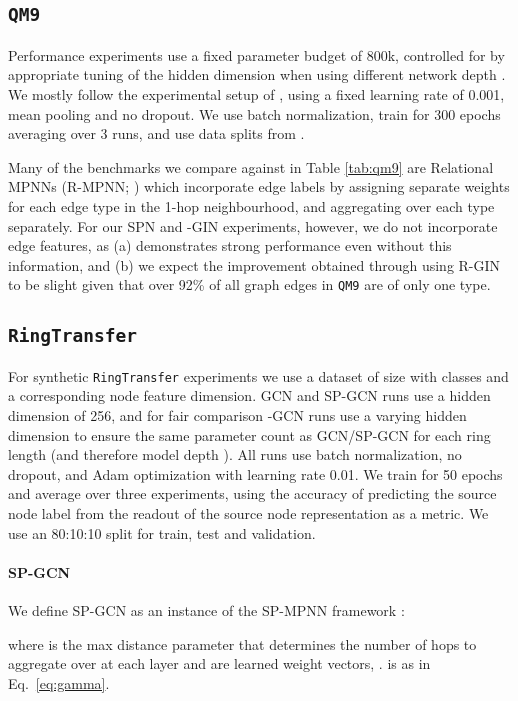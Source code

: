 \documentclass{article}
\theoremstyle{plain}
\theoremstyle{definition}
\theoremstyle{remark}
\begin{document}
\subsection{\texttt{QM9}}
Performance experiments use a fixed parameter budget of 800k, controlled for by appropriate tuning of the hidden dimension when using different network depth . We mostly follow the experimental setup of \cite{abboud2022shortest}, using a fixed learning rate of 0.001, mean pooling and no dropout. We use batch normalization, train for 300 epochs averaging over 3 runs, and use data splits from \cite{brockschmidt2020gnn}.

Many of the benchmarks we compare against in Table \ref{tab:qm9} are Relational MPNNs (R-MPNN; \citet{schlichtkrull2018modeling, brockschmidt2020gnn}) which incorporate edge labels by assigning separate weights for each edge type in the 1-hop neighbourhood, and aggregating over each type separately.
For our SPN and -GIN experiments, however, we do not incorporate edge features, as (a)  demonstrates strong performance even without this information, and (b) we expect the improvement obtained through using R-GIN to be slight given that over 92\% of all graph edges in \texttt{QM9} are of only one type.

\subsection{\texttt{RingTransfer}}
For synthetic \texttt{RingTransfer} \cite{bodnar2021weisfeilercell} experiments we use a dataset of size  with  classes and a corresponding node feature dimension. GCN and SP-GCN runs use a hidden dimension of 256, and for fair comparison -GCN runs use a varying hidden dimension to ensure the same parameter count as GCN/SP-GCN for each ring length  (and therefore model depth ). All runs use batch normalization, no dropout, and Adam optimization with learning rate 0.01. We train for 50 epochs and average over three experiments, using the accuracy of predicting the source node label from the readout of the source node representation as a metric. We use an 80:10:10 split for train, test and validation.

\paragraph{SP-GCN}
We define SP-GCN as an instance of the SP-MPNN framework \cite{abboud2022shortest}:

where  is the max distance parameter that determines the number of hops to aggregate over at each layer and  are learned weight vectors, .  is as in Eq.~\eqref{eq:gamma}.
\end{document}
